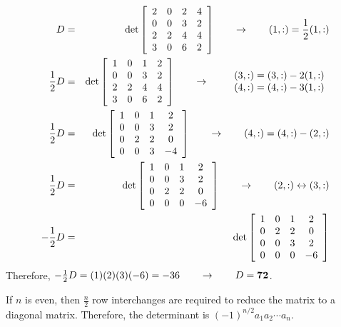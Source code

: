 \vspace{2mm}
\begin{eqnarray*}
  D&=&\det\left[\begin{array}{cccc}2&0&2&4\\0&0&3&2\\2&2&4&4\\3&0&6&2\end{array}\right]
	\qquad\rightarrow\qquad(1,:)=\frac{1}{2}(1,:)\\
	\frac{1}{2}D&=&\det\left[\begin{array}{cccc}1&0&1&2\\0&0&3&2\\2&2&4&4\\3&0&6&2\end{array}\right]
	\qquad\rightarrow\qquad\begin{array}{c}(3,:)=(3,:)-2(1,:)\\(4,:)=(4,:)-3(1,:)\end{array}\\
	\frac{1}{2}D&=&\det\left[\begin{array}{cccc}1&0&1&2\\0&0&3&2\\0&2&2&0\\0&0&3&-4\end{array}\right]
	\qquad\rightarrow\qquad(4,:)=(4,:)-(2,:)\\
	\frac{1}{2}D&=&\det\left[\begin{array}{cccc}1&0&1&2\\0&0&3&2\\0&2&2&0\\0&0&0&-6\end{array}\right]
	\qquad\rightarrow\qquad(2,:)\leftrightarrow(3,:)\\
	-\frac{1}{2}D&=&\det\left[\begin{array}{cccc}1&0&1&2\\0&2&2&0\\0&0&3&2\\0&0&0&-6\end{array}\right]
\end{eqnarray*}
Therefore, $-\frac{1}{2}D=(1)(2)(3)(-6)=-36\qquad\rightarrow\qquad D=\bf72$.

\vspace{2mm}
If $n$ is even, then $\frac{n}{2}$ row interchanges are required to reduce the matrix to a diagonal matrix. Therefore, the determinant is $(-1)^{n/2}a_1a_2\cdots a_n$.

